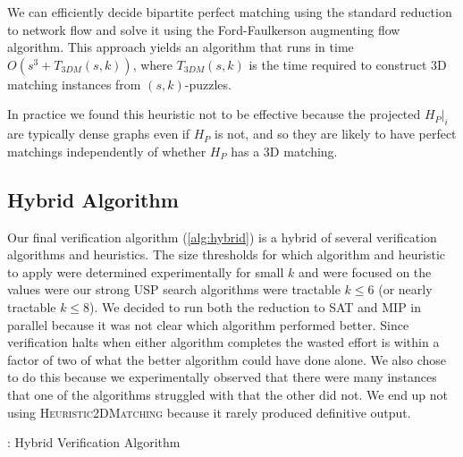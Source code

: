 \documentclass[11pt]{article}
\begin{document}
We can efficiently decide bipartite perfect matching using the
standard reduction to network flow and solve it using the
Ford-Faulkerson augmenting flow algorithm.  This approach yields an
algorithm that runs in time $O(s^3 + T_{3DM}(s,k))$, where
$T_{3DM}(s,k)$ is the time required to construct 3D matching instances
from $(s,k)$-puzzles.

In practice we found this heuristic not to be effective because the
projected $H_P|_i$ are typically dense graphs even if $H_P$ is not, and so
they are likely to have perfect matchings independently of whether $H_P$
has a 3D matching.



\subsection{Hybrid Algorithm}

Our final verification algorithm (\autoref{alg:hybrid}) is a hybrid of several verification
algorithms and heuristics.  The size thresholds for which algorithm
and heuristic to apply were determined experimentally for small $k$
and were focused on the values were our strong USP search algorithms
were tractable $k \le 6$ (or nearly tractable $k \le 8$).  We decided
to run both the reduction to SAT and MIP in parallel because it was
not clear which algorithm performed better.  Since verification halts
when either algorithm completes the wasted effort is within a factor
of two of what the better algorithm could have done alone.  We also
chose to do this because we experimentally observed that there were
many instances that one of the algorithms struggled with that the
other did not.  We end up not using \textsc{Heuristic2DMatching}
because it rarely produced definitive output.

\begin{algorithm}
  \caption{: Hybrid Verification Algorithm}
  \label{alg:hybrid}
\begin{algorithmic}[1]
    \EndIf
    \EndIf
    \EndIf
  \EndFunction
\end{algorithmic}
\end{algorithm}
\end{document}
